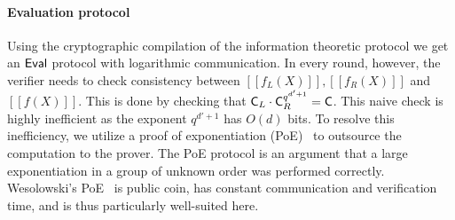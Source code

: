 

\paragraph{Evaluation protocol}
Using the cryptographic compilation of the information theoretic protocol we get an $\textsf{{Eval}}$ protocol with logarithmic communication. In every round, however, the verifier needs to check consistency between $[\![f_L(X)]\!],[\![f_R(X)]\!]$ and $[\![f(X)]\!]$. This is done by checking that $\mathsf{C}_L \cdot \mathsf{C}_R^{q^{d'+1}}=\mathsf{C}$. This naive check is highly inefficient as the exponent $q^{d'+1}$ has $O(d)$ bits.
To resolve this inefficiency, we utilize a proof of exponentiation (\textsf{PoE})~\cite{ITCS:Pietrzak18,EC:Wesolowski19} to outsource the computation to the prover.
The \textsf{PoE} protocol is an argument that a large exponentiation in a group of unknown order was performed correctly. Wesolowski's \textsf{PoE}~\cite{EC:Wesolowski19} is public coin, has constant communication and verification time, and is thus particularly well-suited here.

